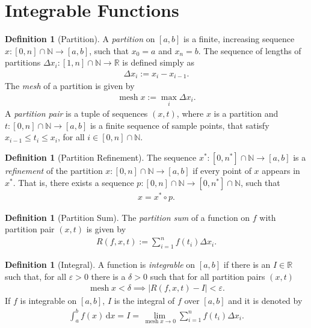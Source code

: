 \documentclass{amsart}
\numberwithin{equation}{section}
\DeclareMathOperator{\mesh}{mesh}
\theoremstyle{plain}
\theoremstyle{definition}
\newtheorem{definition}[theorem]{Definition}
\theoremstyle{remark}
\begin{document}
\section{Integrable Functions}

\begin{definition}[Partition]
  A \emph{partition} on $[a,b]$ is a finite, increasing sequence $x:[0,n]\cap\mathbb{N} \to [a,b]$, such that $x_0 = a$ and $x_n = b$.
  The sequence of lengths of partitions $\Delta x_i:[1,n]\cap\mathbb{N}\to\mathbb{R}$ is defined simply as
  \begin{align*}
    \Delta x_i := x_i - x_{i-1}.
  \end{align*}
  The \emph{mesh} of a partition is given by
  \begin{align*}
    \mesh x := \max_i \Delta x_i.
  \end{align*}
  A \emph{partition pair} is a tuple of sequences $(x, t)$, where $x$ is a partition and $t:[0,n]\cap\mathbb{N} \to [a,b]$ is a finite sequence of sample points, that satisfy $x_{i-1}\leq t_i \leq x_i$, for all $i\in[0,n]\cap\mathbb{N}$.  
\end{definition}

\begin{definition}[Partition Refinement]
  The sequence $x^*:[0,n^*]\cap\mathbb{N} \to [a, b]$ is a \emph{refinement} of the partition $x:[0, n]\cap\mathbb{N} \to [a, b]$ if every point of $x$ appears in $x^*$.
  That is, there exists a sequence $p: [0, n]\cap\mathbb{N} \to [0, n^*]\cap\mathbb{N}$, such that
  \begin{align*}
    x = x^* \circ p.
  \end{align*}
\end{definition}

\begin{definition}[Partition Sum]
  The \emph{partition sum} of a function on $f$ with partition pair $(x, t)$ is given by
  \begin{align*}
    R(f,x,t):= \sum_{i=1}^n f(t_i) \Delta x_i.
  \end{align*}
\end{definition}

\begin{definition}[Integral]
  A function is \emph{integrable} on $[a,b]$ if there is an $I\in\mathbb{R}$ such that, for all $\varepsilon>0$ there is a $\delta>0$ such that for all partition pairs $(x, t)$
  \begin{align*}
    \mesh x < \delta \implies |R(f,x,t)- I| < \varepsilon.
  \end{align*}
  If $f$ is integrable on $[a,b]$, $I$ is the integral of $f$ over $[a,b]$ and it is denoted by
  \begin{align*}
    \int^b_a f(x) \,\mathrm{d} x = I = \lim_{\mesh x \to 0} \sum^n_{i=1} f(t_i) \Delta x_i.
  \end{align*}
\end{definition}
\end{document}
